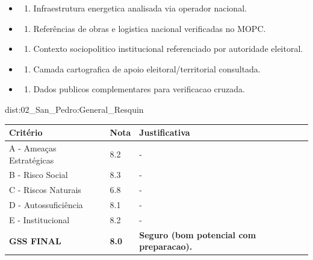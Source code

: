 {\begin{itemize}
\item
  \begin{enumerate}
  \def\labelenumi{\arabic{enumi})}
  \setcounter{enumi}{7}
  \tightlist
  \item
    Infraestrutura energetica analisada via operador nacional.
  \end{enumerate}
\item
  \begin{enumerate}
  \def\labelenumi{\arabic{enumi})}
  \setcounter{enumi}{8}
  \tightlist
  \item
    Referências de obras e logistica nacional verificadas no MOPC.
  \end{enumerate}
\item
  \begin{enumerate}
  \def\labelenumi{\arabic{enumi})}
  \setcounter{enumi}{9}
  \tightlist
  \item
    Contexto sociopolitico institucional referenciado por autoridade
    eleitoral.
  \end{enumerate}
\item
  \begin{enumerate}
  \def\labelenumi{\arabic{enumi})}
  \setcounter{enumi}{10}
  \tightlist
  \item
    Camada cartografica de apoio eleitoral/\allowbreak territorial consultada.
  \end{enumerate}
\item
  \begin{enumerate}
  \def\labelenumi{\arabic{enumi})}
  \setcounter{enumi}{11}
  \tightlist
  \item
    Dados publicos complementares para verificacao cruzada.
  \end{enumerate}
\end{itemize}}{dist:02_San_Pedro:General_Resquin}
\begin{table}[ht!]
\small \begin{tabular}{p{3.0cm}p{0.8cm}p{6.0cm}} \toprule
\textbf{Critério} & \textbf{Nota} & \textbf{Justificativa} \\ \midrule
A - Ameaças Estratégicas & 8.2 & - \\
B - Risco Social & 8.3 & - \\
C - Riscos Naturais & 6.8 & - \\
D - Autossuficiência & 8.1 & - \\
E - Institucional & 8.2 & - \\
\midrule \textbf{GSS FINAL} & \textbf{8.0} & \textbf{Seguro (bom potencial com preparacao).} \\ \bottomrule \end{tabular}
\end{table}
